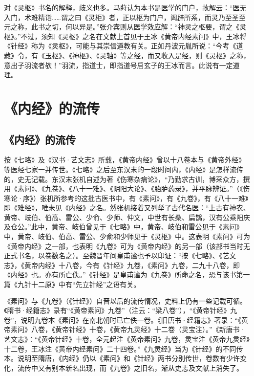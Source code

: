 \documentclass[draft,12pt]{ctexbook}
\begin{document}
对《灵枢》书名的解释，歧义也多。马莳认为本书是医学的门户，故解云：“医无入门，术难精诣……谓之曰《灵柜》者，正以枢为门户，阖辟所系，而灵乃至圣至元之称，此书之切，何以异是。”张介宾则从医学效应解：“神灵之枢要，谓之《灵枢》。”不过，须知《灵枢》之名在文献上首见于王冰《黄帝内经素问》中，王冰将《针经》称为《灵枢》，可能与其崇信道教有关。正如丹波元胤所说：“今考《道藏》令，有《玉枢》、《神枢》、《灵轴》等之经，而又收入是经，则《灵枢》之称，意出子羽流者欤！”羽流，指道士，即指道号启玄子的王冰而言。此说有一定道理。

\section{《内经》的流传} %

\subsection{《内经》的流传} %

按《七略》及《汉书·艺文志》所载，《黄帝内经》曾以十八卷本与《黄帝外经》等医经七家一并传世。《七略》之后至东汉末的一段时间内，《内经》是怎样流传的，史无记载。东汉末张机自述为著《伤寒杂病论》，“乃勤求古训，博采众方，撰用《素问》、《九卷》、《八十一难》、《阴阳大论》、《胎胪药录》，并平脉辨证。”（《伤寒论·序》）张机所参考的这批古医书中，有《素问》，有《九卷》，有《八十一难》即《难经》，唯未见《内经》之名。然张机接着又列举了古代名医：“上古有神农、黄帝、岐伯、伯高、雷公、少俞、少师、仲文，中世有长桑、扁鹊，汉有公乘阳庆及仓公。”此中，黄帝、岐伯曾见于《七略》中，黄帝、岐伯和雷公见于《素问》中，黄帝、岐伯、伯高、雷公、少俞和少师见于《灵枢》中。这表明《素问》可为《黄帝内经》之一部，也表明《九卷》可为《黄帝内经》的另一部（该部书当时无正式书名，以卷数名之）。至魏晋年间皇甫谧也予以印证：“按《七略》、《艺文志》，《黄帝内经》十八卷，今有《针经》九卷，《素问》九卷，二九十八卷，即《内经》也。亦有所亡佚。”《针经》是皇甫谧为《九卷》所命之名，恐与该书第一篇《九针十二原》中有“先立针经”之语有关。

《素问》与《九卷》（《针经》）自晋以后的流传惰况，史料上仍有一些记载可循。《隋书·经籍志》录有“《黄帝素问》九卷”（注云：“梁八卷”），“《黄帝针经》九卷”，说明九卷本《素问》在南北朝时已亡佚一卷。《旧唐书·经籍志》著录：“《黄帝素问》八卷，《黄帝针经》十卷，《黄帝九灵经》十二卷（灵宝注）。”《新唐书·艺文志》：“《黄帝针经》十卷，全元起注《黄帝素问》九卷，灵宝注《黄帝九灵经》十二卷，王冰注《黄帝内经素问》二十四卷。”《九灵经》当为《针经》的不同传本。说明至隋唐，《内经》仍以《素问》和《针经》两书分别传世，卷数有少许变化，流传中又有别本新名出现，而《九卷》之旧名，渐从史志及文献上消失了。
\end{document}

